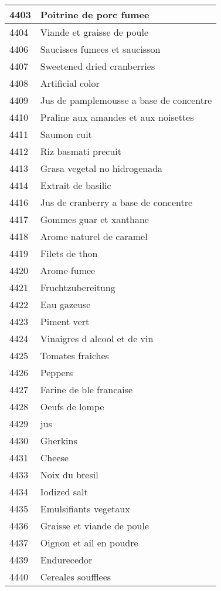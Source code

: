 \begin{longtable}{|l|l|}
4403 & Poitrine de porc fumee \\ \hline 
4404 & Viande et graisse de poule \\ \hline 
4406 & Saucisses fumees et saucisson \\ \hline 
4407 & Sweetened dried cranberries \\ \hline 
4408 & Artificial color \\ \hline 
4409 & Jus de pamplemousse a base de concentre \\ \hline 
4410 & Praline aux amandes et aux noisettes \\ \hline 
4411 & Saumon cuit \\ \hline 
4412 & Riz basmati precuit \\ \hline 
4413 & Grasa vegetal no hidrogenada \\ \hline 
4414 & Extrait de basilic \\ \hline 
4416 & Jus de cranberry a base de concentre \\ \hline 
4417 & Gommes guar et xanthane \\ \hline 
4418 & Arome naturel de caramel \\ \hline 
4419 & Filets de thon \\ \hline 
4420 & Arome fumee \\ \hline 
4421 & Fruchtzubereitung \\ \hline 
4422 & Eau gazeuse \\ \hline 
4423 & Piment vert \\ \hline 
4424 & Vinaigres d alcool et de vin \\ \hline 
4425 & Tomates fraiches \\ \hline 
4426 & Peppers \\ \hline 
4427 & Farine de ble francaise \\ \hline 
4428 & Oeufs de lompe \\ \hline 
4429 & jus \\ \hline 
4430 & Gherkins \\ \hline 
4431 & Cheese \\ \hline 
4433 & Noix du bresil \\ \hline 
4434 & Iodized salt \\ \hline 
4435 & Emulsifiants vegetaux \\ \hline 
4436 & Graisse et viande de poule \\ \hline 
4437 & Oignon et ail en poudre \\ \hline 
4439 & Endurecedor \\ \hline 
4440 & Cereales soufflees \\ \hline 

\end{longtable}
